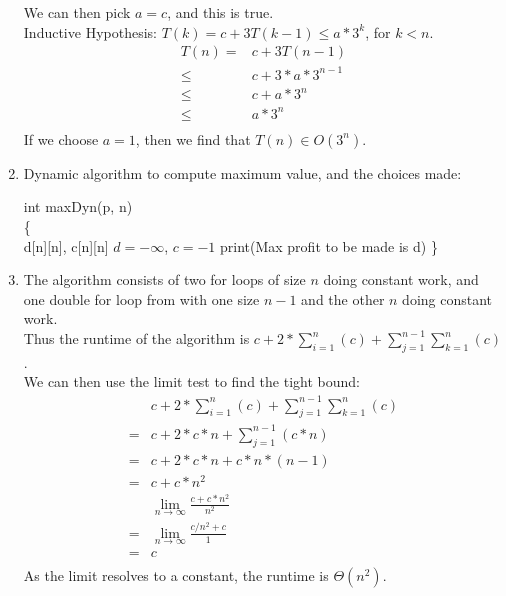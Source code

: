 \documentclass{assignment}
\begin{document}
\begin{problemlist}
\begin{answer}
\begin{enumerate}
We can then pick $a=c$, and this is true.\\
Inductive Hypothesis: $T(k) = c + 3T(k-1) \le a*3^k$, for $k<n$.\\
\begin{align*}
T(n) =& c + 3T(n-1)\\
\le&c + 3*a*3^{n-1}\\
\le&c + a*3^n\\
\le&a*3^n\\
\end{align*}
If we choose $a=1$, then we find that $T(n)\in O(3^n)$.
\clearpage
\item
Dynamic algorithm to compute maximum value, and the choices made:\\
\IncMargin{3em}
\begin{algorithm}
  int maxDyn(p, n)\\\{\\
  \Indp
  d[n][n], c[n][n]\;
  $d = -\infty$, $c = -1$\;
  print(Max profit to be made is d)\;
  \Indm
  \}
\end{algorithm}
\DecMargin{3em}
\item
The algorithm consists of two for loops of size $n$ doing constant work, and one double for loop from with one size $n-1$ and the other $n$ doing constant work.\\
Thus the runtime of the algorithm is $c + 2*\sum_{i=1}^n(c) + \sum_{j=1}^{n-1}\sum_{k=1}^{n}(c)$.\\
We can then use the limit test to find the tight bound:
\begin{align*}
&c + 2*\sum_{i=1}^n(c) + \sum_{j=1}^{n-1}\sum_{k=1}^n(c)\\
=&c + 2*c*n + \sum_{j=1}^{n-1}(c*n)\\
=&c + 2*c*n + c*n*(n-1)\\
=&c + c*n^2\\
&\lim_{n\rightarrow \infty} \frac{c + c*n^2}{n^2}\\
=&\lim_{n\rightarrow \infty} \frac{c/n^2 + c}{1}\\
=&c\\
\end{align*}
As the limit resolves to a constant, the runtime is $\Theta (n^2)$.\\
\end{enumerate}
\end{answer}

\end{problemlist}
\end{document}
